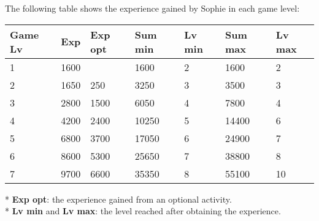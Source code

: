 The following table shows the experience gained by Sophie in each game level:
\begin{table}[H]
\centering
\begin{tabular}{|l|l|l|l|l|l|l|}
\hline
\rowcolor[HTML]{C0C0C0} 
\textbf{Game Lv} & \textbf{Exp} & \textbf{Exp opt} & \textbf{Sum min} & \textbf{Lv min} & \textbf{Sum max} & \textbf{Lv max} \\ \hline
1 & 1600 &  & 1600 & 2 & 1600 & 2 \\ \hline
2 & 1650 & 250 & 3250 & 3 & 3500 & 3 \\ \hline
3 & 2800 & 1500 & 6050 & 4 & 7800 & 4 \\ \hline
4 & 4200 & 2400 & 10250 & 5 & 14400 & 6 \\ \hline
5 & 6800 & 3700 & 17050 & 6 & 24900 & 7 \\ \hline
6 & 8600 & 5300 & 25650 & 7 & 38800 & 8 \\ \hline
7 & 9700 & 6600 & 35350 & 8 & 55100 & 10 \\ \hline
\end{tabular}
\end{table}
* \textbf{Exp opt}: the experience gained from an optional activity. \\
* \textbf{Lv min} and \textbf{Lv max}: the level reached after obtaining the experience.

